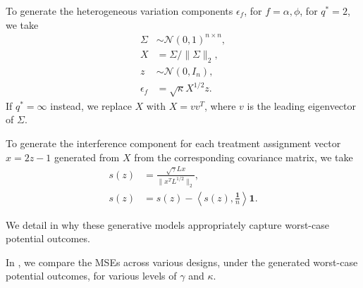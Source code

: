 \documentclass[12pt]{article}
\theoremstyle{definition}
\numberwithin{equation}{section}
\numberwithin{figure}{section}
\newcommand\dotp[1]{\left\langle #1 \right\rangle}
\newcommand{\calN}{{\mathcal N}}
\numberwithin{equation}{section}
\numberwithin{figure}{section}
\begin{document}

To generate the heterogeneous variation components $\epsilon_f$, for $f = \alpha, \phi$, for $q^*=2$, we take
\begin{align*}
    \Sigma &\sim \calN(0,1)^{n \times n}, \\
    X &= \Sigma/\|\Sigma\|_2, \\
    z &\sim \calN(0, I_n), \\
    \epsilon_f &= \sqrt{\kappa} X^{1/2} z.
\end{align*}
If $q^* = \infty$ instead, we replace $X$ with $X = vv^T$, where $v$ is the leading eigenvector of $\Sigma$.


To generate the interference component for each treatment assignment vector $x=2z-1$ generated from $X$ from the corresponding covariance matrix, we take 
\begin{align*}
s(z) &=  \frac{\sqrt{\gamma}L x}{\| x^T L^{1/2} \|_2}, \\
s(z) &=  s(z) - \dotp{s(z), \frac{\mathbf{1}}{n}} \mathbf{1}.
\end{align*}

We detail in  why these generative models appropriately capture worst-case potential outcomes.

In , we compare the MSEs across various designs, under the generated worst-case potential outcomes, for various levels of $\gamma$ and $\kappa$.
\end{document}

